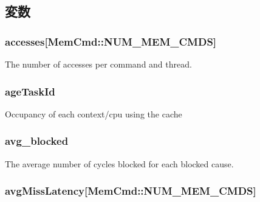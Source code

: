 \subsection{変数}
\hypertarget{group__CacheStatistics_gaa45ed75982de310df369d8bfa4b8896f}{
\subsubsection[{accesses}]{ accesses\mbox{[}MemCmd::NUM\_\-MEM\_\-CMDS\mbox{]}}}
\label{group__CacheStatistics_gaa45ed75982de310df369d8bfa4b8896f}
The number of accesses per command and thread. \hypertarget{group__CacheStatistics_gac02dc8ce25ce56af2d9038844ba89d99}{
\subsubsection[{ageTaskId}]{ ageTaskId}}
\label{group__CacheStatistics_gac02dc8ce25ce56af2d9038844ba89d99}
Occupancy of each context/cpu using the cache \hypertarget{group__CacheStatistics_ga61f8d4c8d21aa6b9347cb04bd401d05f}{
\subsubsection[{avg\_\-blocked}]{ avg\_\-blocked}}
\label{group__CacheStatistics_ga61f8d4c8d21aa6b9347cb04bd401d05f}
The average number of cycles blocked for each blocked cause. \hypertarget{group__CacheStatistics_ga964a436d0a0ae4006fe5a8b418058e44}{
\subsubsection[{avgMissLatency}]{ avgMissLatency\mbox{[}MemCmd::NUM\_\-MEM\_\-CMDS\mbox{]}}}

